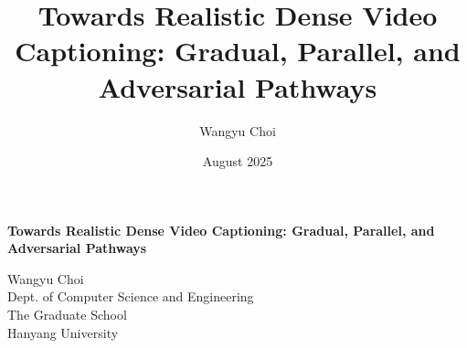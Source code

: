 \documentclass[a4paper,12pt]{HYU}
\date{August 2025}
\title{Towards Realistic Dense Video Captioning: Gradual, Parallel, and Adversarial Pathways}
\author{Wangyu Choi}
\makeatletter
\renewenvironment{abstract}{%
    \if@twocolumn
      \section*{\abstractname}%
    \else %
      \begin{center}%
        {\bfseries \Large\abstractname\vspace{\z@}}%
      \end{center}%
      \quotation
    \fi}
    {\if@twocolumn\else\endquotation\fi}
\makeatother
\begin{document}
\maketitle


\tableofcontents
\listoffigures
\listoftables
\abbreviations
\makenomenclature
\renewcommand{\nomname}{List of Abbreviations}
\printnomenclature
\hfill %




\newpage
\begin{abstract}
\begin{center}
\textbf{\fontsize{13pt}{13} \selectfont  Towards Realistic Dense Video Captioning: Gradual, Parallel, and Adversarial Pathways}
\end{center}
\end{abstract}

\begin{flushleft}
\hspace{6.4cm} {\fontsize{11pt}{16} \selectfont Wangyu Choi}\\
\hspace{6.4cm} {\fontsize{11pt}{16} \selectfont Dept. of Computer Science and Engineering} \\
\hspace{6.4cm} {\fontsize{11pt}{16} \selectfont The Graduate School}\\
\hspace{6.4cm} {\fontsize{11pt}{16} \selectfont Hanyang University}
\end{flushleft}


\mainmatter








\makebibliography
\restoregeometry
\end{document}
